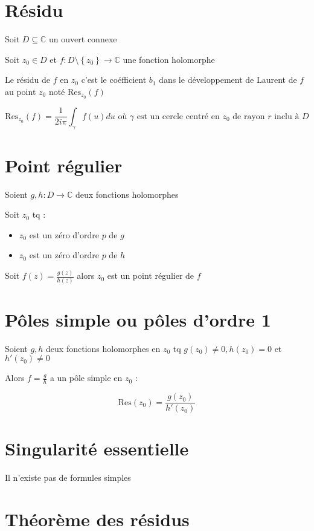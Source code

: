 \documentclass[a4paper,10pt]{report}
\newcommand{\ap}{\rightarrow}
\newcommand{\C}{\mathbb{C}}
\newcommand{\tset}[1]{\left\lbrace #1 \right\rbrace}
\newcommand{\Res}{\mbox{Res}}
\begin{document}
\section{Résidu}

Soit $D \subseteq \C$ un ouvert connexe

Soit $z_0 \in D$ et $f : D \setminus\tset{z_0} \ap \C$ une fonction holomorphe

Le résidu de $f$ en $z_0$ c'est le coéfficient $b_1$ dans le développement de Laurent de $f$ au point $z_0$ noté $\Res_{z_0} (f)$

\[\Res_{z_0} (f) = \frac{1}{2i\pi} \int_\gamma f(u) du \mbox{ où } \gamma
\mbox{ est un cercle centré en } z_0 \mbox{ de rayon } r \mbox{ inclu à } D \]

\section{Point régulier}

Soient $g,h : D \ap \C$ deux fonctions holomorphes

Soit $z_0$ tq :

\begin{itemize}
\item{$z_0$ est un zéro d'ordre $p$ de $g$}
\item{$z_0$ est un zéro d'ordre $p$ de $h$}
\end{itemize}

Soit $f(z) = \frac{g(z)}{h(z)}$ alors $z_0$ est un point régulier de $f$

\section{Pôles simple ou pôles d'ordre 1}

Soient $g,h$ deux fonctions holomorphes en $z_0$ tq $g(z_0) \neq 0, h(z_0) = 0$ et $h'(z_0) \neq 0$

Alors $f = \frac{g}{h}$ a un pôle simple en $z_0$ :

\[\Res(z_0) = \frac{g(z_0)}{h'(z_0)}\]

\section{Singularité essentielle}

Il n'existe pas de formules simples

\section{Théorème des résidus}
\end{document}
